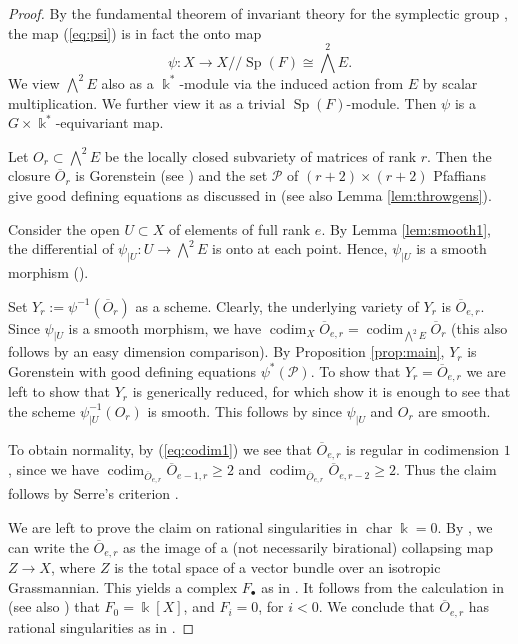 \documentclass[11pt]{amsart}
\numberwithin{equation}{section}
\theoremstyle{definition}
\DeclareMathOperator{\codim}{codim}
\DeclareMathOperator{\Sp}{Sp}
\DeclareMathOperator{\cha}{char}
\newcommand{\mc}{\mathcal}
\newcommand{\ol}{\overline}
\newcommand{\kk}{\Bbbk}
\newcommand{\blue}[1]{\textcolor{blue}{#1}}
\begin{document}
\begin{proof}
By the fundamental theorem of invariant theory for the symplectic group \cite{deconproc}, the map (\ref{eq:psi}) is in fact the onto map
\[\psi: X \longrightarrow  X/\!\!/\Sp(F) \cong \bigwedge^2 E.\]
We view $\bigwedge^2 E$ also as a $\kk^*$-module via the induced action from $E$ by scalar multiplication. We further view it as a trivial $\Sp(F)$-module. Then $\psi$ is a $G\times \kk^*$-equivariant map. 

Let $O_r \subset \bigwedge^2 E$ be the locally closed subvariety of matrices of rank $r$. Then the closure $\ol{O}_r$ is Gorenstein (see \cite[Theorem 17]{kleplaks}) and the set $\mc{P}$ of $(r+2) \times (r+2)$ Pfaffians give good defining equations as discussed in \cite[Section 4.1]{me} (see also Lemma \ref{lem:throwgens}).



Consider the open $U \subset X$ of elements of full rank $e$. By Lemma \ref{lem:smooth1}, the differential of $\psi_{| U} : U \to \bigwedge^2 E$ is onto at each point. Hence, $\psi_{| U}$ is a smooth morphism (\cite[Proposition 10.4]{hartshorne}).

Set $Y_r := \psi^{-1}(\ol{O}_r)$ as a scheme. Clearly, the underlying variety of $Y_r$ is $\ol{O}_{e,r}$. Since  $\psi_{| U}$ is a smooth morphism, we have $\codim_X {\ol{O}_{e,r}} = \codim_{ \bigwedge^2 E} {\ol{O}_r}$ (this also follows by an easy dimension comparison). By Proposition \ref{prop:main}, $Y_r$ is Gorenstein with good defining equations $\psi^*(\mc{P})$. To show that  $Y_r=\ol{O}_{e,r}$ we are left to show that $Y_r$ is generically reduced, for which show it is enough to see that the scheme $\psi^{-1}_{|U}(O_r)$ is smooth. This follows by \cite[Proposition 10.1]{hartshorne} since $\psi_{| U}$ and $O_r$ are smooth.

To obtain normality, by (\ref{eq:codim1}) we see that $\ol{O}_{e,r}$ is regular in codimension $1$, since we have $\codim_{\ol{O}_{e,r}} \ol{O}_{e-1,r} \geq 2$ and $\codim_{\ol{O}_{e,r}} \ol{O}_{e,r-2} \geq 2$. Thus the claim follows by Serre's criterion \cite[Theorem 8.22A]{hartshorne}.

We are left to prove the claim on rational singularities in $\cha \kk=0$. By \cite[Proposition 2.9]{lovett05}, we can write the $\ol{O}_{e,r}$ as the image of a (not necessarily birational) collapsing map $Z \to X$, where $Z$ is the total space of a vector bundle over an isotropic Grassmannian. This yields a complex $F_\bullet$ as in \cite[Theorem 5.1.2]{weymanbook}. It follows from the calculation in \cite[Theorem 4.2]{lovett05} (see also \cite[Theorem 4.6]{lovett05}) that $F_0 = \kk[X]$, and $F_i = 0$, for $i<0$.  We conclude that $\ol{O}_{e,r}$ has rational singularities as in \cite[Theorem 2.1]{lorwey}.
\end{proof}
\end{document}
